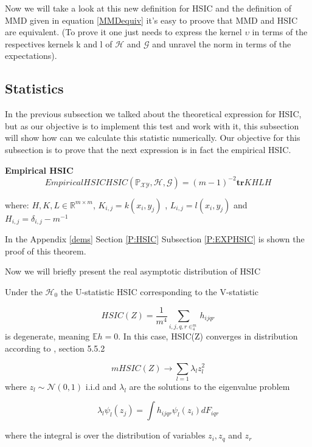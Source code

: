 Now we will take a look at this new definition for HSIC and the definition of MMD given in equation \ref{MMDequiv} it's easy to proove that MMD and HSIC are equivalent. (To prove it one just needs to express the kernel $\upsilon$ in terms of the respectives kernels k and l of  $\mathcal{H}$ and $\mathcal{G}$ and unravel the norm in terms of the expectations).

\subsection{Statistics}

In the previous subsection we talked about the theoretical expression for HSIC, but as our objective is to implement this test and work with it, this subsection will show how can we calculate this statistic numerically.
Our objective for this subsection is to prove that the next expression is in fact the empirical HSIC.

\textsf{\textbf{Empirical HSIC}}
\begin{equation}{Empirical HSIC}
HSIC(\mathbb{P}_{\mathcal{X}\mathcal{Y}},\mathcal{H},\mathcal{G}) = (m-1)^{-2}\textbf{tr}KHLH
\end{equation}

where: $H,K,L \in \mathbb{R}^{m \times m}$, $K_{i,j} = k(x_{i},y_{j})$ , $L_{i,j} = l(x_{i},y_{j})$ and $H_{i,j} = \delta_{i,j} - m^{-1}$


In the Appendix \ref{dems} Section \ref{P:HSIC} Subsection \ref{P:EXPHSIC} is shown the proof of this theorem.

Now we will briefly present the real asymptotic distribution of HSIC
\begin{thm}
Under the $\mathcal{H}_{0}$ the U-statistic HSIC corresponding to the V-statistic 
\vspace{5mm}

$$ HSIC(Z) = \frac{1}{m^{4}}\sum_{i,j,q,r \in_{4}^{m}} h_{ijqr}$$ 
is degenerate, meaning $\mathbb{E}h=0$. In this case, HSIC(Z) converges in distribution according to \cite{HSICDegenerate}, section 5.5.2
\vspace{5mm}

$$mHSIC(Z)\rightarrow \sum_{l=1} \lambda_{l}z_{l}^{2}$$
where $z_{l}\sim \mathcal{N}(0,1)$ i.i.d and $\lambda_{l}$ are the solutions to the eigenvalue problem

$$
\lambda_{l}\psi_{l}(z_{j}) = \int h_{ijqr}\psi_{l}(z_{i})dF_{iqr}
$$

where the integral is over the distribution of variables $z_{i},z_{q}$ and $z_{r}$\cite{HSICdistribution}
\end{thm}

